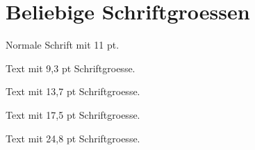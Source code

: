 \documentclass[11pt,a4paper]{article}
\begin{document}
\section{Beliebige Schriftgroessen}

Normale Schrift mit 11 pt.

\bigskip

{\fontsize{9.3pt}{12pt}\selectfont
Text mit 9,3 pt Schriftgroesse.\par}

\bigskip

{\fontsize{13.7pt}{17pt}\selectfont
Text mit 13,7 pt Schriftgroesse.\par}

\bigskip

{\fontsize{17.5pt}{22pt}\selectfont
Text mit 17,5 pt Schriftgroesse.\par}

\bigskip

{\fontsize{24.8pt}{30pt}\selectfont
Text mit 24,8 pt Schriftgroesse.\par}
\end{document}
